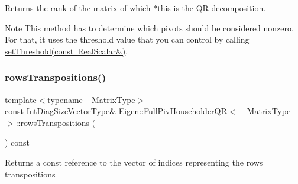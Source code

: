 \begin{DoxyReturn}{Returns}
the rank of the matrix of which $\ast$this is the QR decomposition.
\end{DoxyReturn}
\begin{DoxyNote}{Note}
This method has to determine which pivots should be considered nonzero. For that, it uses the threshold value that you can control by calling \mbox{\hyperlink{class_eigen_1_1_full_piv_householder_q_r_a92277e572bf98245891015d12dd2b602}{set\+Threshold(const Real\+Scalar\&)}}. 
\end{DoxyNote}
\mbox{\label{class_eigen_1_1_full_piv_householder_q_r_abebbfc0ca6e3dd285a0ad0c907abb093}} 
\subsubsection{\texorpdfstring{rowsTranspositions()}{rowsTranspositions()}}
{\footnotesize\ttfamily template$<$typename \+\_\+\+Matrix\+Type$>$ \\
const \mbox{\hyperlink{class_eigen_1_1_matrix}{Int\+Diag\+Size\+Vector\+Type}}\& \mbox{\hyperlink{class_eigen_1_1_full_piv_householder_q_r}{Eigen\+::\+Full\+Piv\+Householder\+QR}}$<$ \+\_\+\+Matrix\+Type $>$\+::rows\+Transpositions (\begin{DoxyParamCaption}{ }\end{DoxyParamCaption}) const\hspace{0.3cm}{\ttfamily [inline]}}

\begin{DoxyReturn}{Returns}
a const reference to the vector of indices representing the rows transpositions 
\end{DoxyReturn}
\mbox{\label{class_eigen_1_1_full_piv_householder_q_r_a92277e572bf98245891015d12dd2b602}} 
